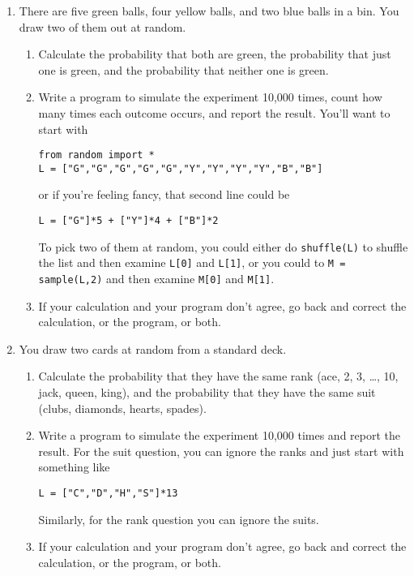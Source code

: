 \documentclass{article}
\author{Due Friday, November 5, 2021}
\date{Math 205}
\begin{document}
\maketitle

\begin{enumerate}

\item There are five green balls, four yellow balls, and two blue balls in a bin.  You draw two of them out at random.
\begin{enumerate}
\item Calculate the probability that both are green, the probability that just one is green, and the probability that neither one is green.
\item Write a program to simulate the experiment 10,000 times, count how many times each outcome occurs, and report the result.  You'll want to start with
\begin{verbatim}
from random import *
L = ["G","G","G","G","G","Y","Y","Y","Y","B","B"]
\end{verbatim}
or if you're feeling fancy, that second line could be
\begin{verbatim}
L = ["G"]*5 + ["Y"]*4 + ["B"]*2
\end{verbatim}
To pick two of them at random, you could either do \verb|shuffle(L)| to shuffle the list and then examine \verb|L[0]| and \verb|L[1]|, or you could to \verb|M = sample(L,2)| and then examine \verb|M[0]| and \verb|M[1]|.

\item If your calculation and your program don't agree, go back and correct the calculation, or the program, or both.
\end{enumerate}

\item You draw two cards at random from a standard deck.
\begin{enumerate}
\item Calculate the probability that they have the same rank (ace, 2, 3, \dots, 10, jack, queen, king), and the probability that they have the same suit (clubs, diamonds, hearts, spades).
\item Write a program to simulate the experiment 10,000 times and report the result.  For the suit question, you can ignore the ranks and just start with something like
\begin{verbatim}
L = ["C","D","H","S"]*13
\end{verbatim}
Similarly, for the rank question you can ignore the suits.
\item If your calculation and your program don't agree, go back and correct the calculation, or the program, or both.
\end{enumerate}
\pagebreak


\end{enumerate}
\end{document}
